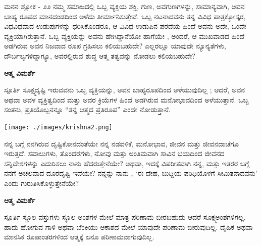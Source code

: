 \begin{mananam}{\mananamfont ಮನನ ಶ್ಲೋಕ - ೨೨}
\footnotesize \mananamtext ನಮ್ಮ ಸಮಾಜದಲ್ಲಿ ಒಬ್ಬ ವ್ಯಕ್ತಿಯ ಶಕ್ತಿ, ಗುಣ, ಅವಗುಣಗಳನ್ನು, ಸಾಮಾನ್ಯವಾಗಿ, ಅವನ ಬಾಹ್ಯ ರೂಪದ ಮಾನದಂಡದಿಂದ ಅಳೆದು ತೀರ್ಮಾನಿಸುತ್ತೇವೆ. ಒಬ್ಬ ನಟನಾದವನು ತನ್ನ ವಿವಿಧ ಪಾತ್ರಕ್ಕೋಸ್ಕರ, ವಿಧವಿಧವಾದ ಉಡುಪುಗಳನ್ನು ಧರಿಸಿಕೊಂಡರೂ, ಆ ವಿವಿಧ ಉಡುಪಿನ ಪರದೆಯ ಹಿಂದೆ ಅವನು ಅದೇ, ಒಂದೇ ವ್ಯಕ್ತಿಯಾಗಿರುತ್ತಾನೆ. ಒಬ್ಬ ವ್ಯಕ್ತಿಯನ್ನು ಅವನು ಹೇಗಿದ್ದಾನೆಯೋ ಹಾಗೆಯೇ , ಅಂದರೆ,  ಆ ಮುಖವಾಡದ ಹಿಂದೆ ಅಡಗಿರುವ ಅವನ ನಿಜವಾದ ರೂಪ ಗ್ರಹಿಸಲು ಕಲಿಯಬಹುದೇ? ಎಲ್ಲರಲ್ಲೂ ಯಾವುದೇ ನ್ಯೂನ್ಯತೆಗಳು, ದೌರ್ಬಲ್ಯಗಳಿದ್ದಾಗ್ಯೂ, ಅವರಲ್ಲಿರುವ ಶುದ್ಧ ಆತ್ಮ ತತ್ವವನ್ನು ನೋಡಲು ಕಲಿಯಬಹುದೇ?
\end{mananam}
\WritingHand\enspace\textbf{ಆತ್ಮ ವಿಮರ್ಶೆ}
\begin{inspiration}{\mananamfont ಸ್ಪೂರ್ತಿ}
\footnotesize \mananamtext ಸೂಕ್ಷ್ಮದೃಷ್ಟಿ ಇರುವವನು ಒಬ್ಬ ವ್ಯಕ್ತಿಯನ್ನು, ಅವನ ಬಾಹ್ಯರೂಪದಿಂದ ಅಳೆಯುವುದಿಲ್ಲ ;  ಆದರೆ, ಅವನ ಅಥವಾ ಅವಳ ವ್ಯಕ್ತಿತ್ವದಿಂದ ಮತ್ತು  ಅವರ ಕ್ರಿಯೆಗಳ ಹಿಂದೆ ಅಡಗಿರುವ  ಮನೋಭಾವದಿಂದ ಅಳೆಯುತ್ತಾನೆ. ಒಬ್ಬ ಸಂತನು, ಪ್ರತಿಯೊಬ್ಬನನ್ನೂ “ತನ್ನ ಆತ್ಮದ ಪ್ರತಿರೂಪ” ಎಂದೇ ನೋಡುತ್ತಾನೆ.
\end{inspiration}
\newpage

\thispagestyle{empty}
\begin{center}
\texttt{[image: ./images/krishna2.png]}
\end{center}
\restoregeometry %
\newpage

\begin{mananam}{}
\footnotesize \mananamtext ನನ್ನ ಬಗ್ಗೆ ನನಗಿರುವ ದೃಷ್ಟಿಕೋನದಂತೆಯೇ ನನ್ನ ನಡವಳಿಕೆ, ಮನೋಭಾವ, ಜೀವನ ಮತ್ತು ಜೀವನದಾಚೆಗೂ  ಇರುತ್ತದೆ. ಸವಾಲುಗಳು, ತೊಂದರೆಗಳು, ನೋವು ಮತ್ತು ಅಂತಿಮವಾಗಿ ಸಾವಿನ ಭಯದಿಂದ ಜೀವನದ ಸನ್ನಿವೇಶಗಳನ್ನು ಎದುರಿಸಲು ನಾನು ಹೆದರುತ್ತೇನೆಯೇ? ಅಥವಾ, ಇದಕ್ಕೆ ವಿಪರೀತವಾಗಿ ನನ್ನ, ಮತ್ತು ಇತರರ ಬಗ್ಗೆ ನನಗೆ ಅಚಲವಾದ ದೂರದೃಷ್ಟಿ ಇದೆಯೇ?  ನನ್ನನ್ನು ನಾನು , ‘ಈ ದೇಹ, ಬುದ್ದಿಯ ಪರಿಧಿಯೊಳಗೆ ಸೀಮಿತನಾದವನು’ ಎಂದು ಗುರುತಿಸಿಕೊಳ್ಳುತ್ತೇನೆಯೇ? 
\end{mananam}
\WritingHand\enspace\textbf{ಆತ್ಮ ವಿಮರ್ಶೆ}
\begin{inspiration}{\mananamfont ಸ್ಪೂರ್ತಿ}
\footnotesize \mananamtext ಸ್ಥೂಲ ವಸ್ತುಗಳು ಸ್ಥೂಲ ಅಂಶಗಳ ಮೇಲೆ ಮಾತ್ರ ಪರಿಣಾಮ ಬೀರಬಹುದು ಆದರೆ ಸೂಕ್ಷ್ಮಅಂಶಗಳಿಗಲ್ಲ. ಹಾದು ಹೋಗುವ ಗಾಳಿ ಅಥವಾ ಬೆಂಕಿಯು ಆಕಾಶದ ಮೇಲೆ ಯಾವುದೇ ಪರಿಣಾಮ ಬೀರುವುದಿಲ್ಲ. ದೈಹಿಕ ಅಥವಾ ಮಾನಸಿಕ ರೂಪಾಂತರಗಳಿಂದ ಆತ್ಮಕ್ಕೆ ಏನೂ ಪರಿಣಾಮವಾಗುವುದಿಲ್ಲ.
\end{inspiration}
\newpage

